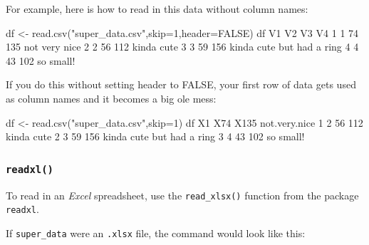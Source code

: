 \documentclass[
]{book}
\newenvironment{Shaded}{\begin{snugshade}}{\end{snugshade}}
\newcommand{\AttributeTok}[1]{\textcolor[rgb]{0.77,0.63,0.00}{#1}}
\newcommand{\ConstantTok}[1]{\textcolor[rgb]{0.00,0.00,0.00}{#1}}
\newcommand{\DecValTok}[1]{\textcolor[rgb]{0.00,0.00,0.81}{#1}}
\newcommand{\FunctionTok}[1]{\textcolor[rgb]{0.00,0.00,0.00}{#1}}
\newcommand{\NormalTok}[1]{#1}
\newcommand{\OtherTok}[1]{\textcolor[rgb]{0.56,0.35,0.01}{#1}}
\newcommand{\SpecialCharTok}[1]{\textcolor[rgb]{0.00,0.00,0.00}{#1}}
\newcommand{\StringTok}[1]{\textcolor[rgb]{0.31,0.60,0.02}{#1}}
\begin{document}
For example, here is how to read in this data without column names:

\begin{Shaded}
\begin{Highlighting}[]
\NormalTok{df }\OtherTok{\textless{}{-}} \FunctionTok{read.csv}\NormalTok{(}\StringTok{"super\_data.csv"}\NormalTok{,}\AttributeTok{skip=}\DecValTok{1}\NormalTok{,}\AttributeTok{header=}\ConstantTok{FALSE}\NormalTok{)}
\NormalTok{df}
\NormalTok{  V1 V2  V3                        V4}
\DecValTok{1}  \DecValTok{1} \DecValTok{74} \DecValTok{135}\NormalTok{             not very nice}
\DecValTok{2}  \DecValTok{2} \DecValTok{56} \DecValTok{112}\NormalTok{                kinda cute}
\DecValTok{3}  \DecValTok{3} \DecValTok{59} \DecValTok{156}\NormalTok{ kinda cute but had a ring}
\DecValTok{4}  \DecValTok{4} \DecValTok{43} \DecValTok{102}\NormalTok{                 so small}\SpecialCharTok{!}
\end{Highlighting}
\end{Shaded}

If you do this without setting header to FALSE, your first row of data gets used as column names and it becomes a big ole mess:

\begin{Shaded}
\begin{Highlighting}[]
\NormalTok{df }\OtherTok{\textless{}{-}} \FunctionTok{read.csv}\NormalTok{(}\StringTok{"super\_data.csv"}\NormalTok{,}\AttributeTok{skip=}\DecValTok{1}\NormalTok{)}
\NormalTok{df}
\NormalTok{  X1 X74 X135             not.very.nice}
\DecValTok{1}  \DecValTok{2}  \DecValTok{56}  \DecValTok{112}\NormalTok{                kinda cute}
\DecValTok{2}  \DecValTok{3}  \DecValTok{59}  \DecValTok{156}\NormalTok{ kinda cute but had a ring}
\DecValTok{3}  \DecValTok{4}  \DecValTok{43}  \DecValTok{102}\NormalTok{                 so small}\SpecialCharTok{!}
\end{Highlighting}
\end{Shaded}

\hypertarget{readxl}{%
\subsubsection*{\texorpdfstring{\texttt{readxl()}}{readxl()}}\label{readxl}}

To read in an \emph{Excel} spreadsheet, use the \texttt{read\_xlsx()} function from the package \texttt{readxl}.

If \texttt{super\_data} were an \texttt{.xlsx} file, the command would look like this:
\end{document}
